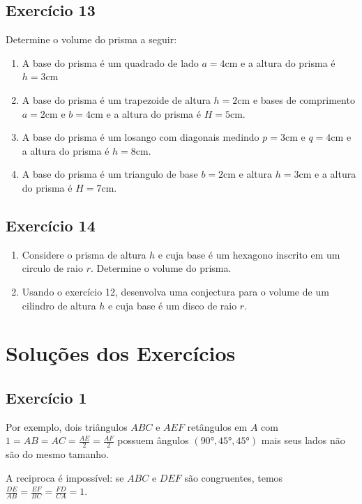 \subsection*{Exercício 13}

Determine o volume do prisma a seguir:

\begin{enumerate}
\item A base do prisma é um quadrado de lado $a=4\text{cm}$ e a altura
  do prisma é $h=3\text{cm}$
\item A base do prisma é um trapezoide de altura $h=2\text{cm}$ e bases de
  comprimento  $a=2\text{cm}$ e $b=4\text{cm}$ e a altura do prisma é
  $H=5\text{cm}$.
\item A base do prisma é um losango com diagonais medindo $p=3\text{cm}$ 
  e $q=4\text{cm}$ e a altura do prisma é $h = 8 \text{cm}$.
\item A base do prisma é um triangulo de base $b=\text{2}\text{cm}$ e
  altura $h=3\text{cm}$ e a altura do prisma é $H=7\text{cm}$.
\end{enumerate}

\subsection*{Exercício 14}

\begin{enumerate}
\item Considere o prisma de altura $h$ e cuja base é um hexagono inscrito em um
  circulo de raio $r$. Determine o volume do prisma.
\item Usando o exercício 12, desenvolva uma conjectura para o volume de um
  cilindro de altura $h$ e cuja base é um disco de raio $r$.
\end{enumerate}

\section{Soluções dos Exercícios}

\subsection*{Exercício 1}

Por exemplo, dois triângulos $ABC$ e $AEF$ retângulos em $A$ com
$1 = {AB} = {AC} = \frac{AE}{2} = \frac{AF}{2}$ possuem ângulos
$(90°, 45°, 45°)$ mais seus lados não são do mesmo tamanho.

A reciproca é impossível: se $ABC$ e $DEF$ são congruentes, temos
$\frac{DE}{AB} = \frac{EF}{BC} = \frac{FD}{CA} = 1$.

